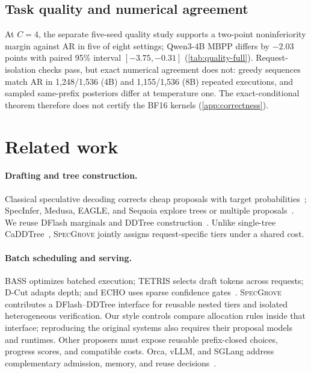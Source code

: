 \documentclass{article}
\newcommand{\method}{\textsc{SpecGrove}\xspace}
\begin{document}
\subsection{Task quality and numerical agreement}
\label{sec:quality}
At $C=4$, the separate five-seed quality study supports a two-point noninferiority margin against AR in five of eight settings; Qwen3-4B MBPP differs by $-2.03$ points with paired 95\% interval $[-3.75,-0.31]$ (\cref{tab:quality-full}). Request-isolation checks pass, but exact numerical agreement does not: greedy sequences match AR in 1,248/1,536 (4B) and 1,155/1,536 (8B) repeated executions, and sampled same-prefix posteriors differ at temperature one. The exact-conditional theorem therefore does not certify the BF16 kernels (\cref{app:correctness}).

\section{Related work}
\label{sec:related}
\paragraph{Drafting and tree construction.}
Classical speculative decoding corrects cheap proposals with target probabilities~\citep{leviathan2023fast,chen2023accelerating}; SpecInfer, Medusa, EAGLE, and Sequoia explore trees or multiple proposals~\citep{miao2024specinfer,cai2024medusa,li2024eagle,chen2024sequoia}. We reuse DFlash marginals and DDTree construction~\citep{chen2026dflash,ringel2026ddtree}. Unlike single-tree CaDDTree~\citep{zhang2026caddtree}, \method jointly assigns request-specific tiers under a shared cost.

\paragraph{Batch scheduling and serving.}
BASS optimizes batched execution; TETRIS selects draft tokens across requests; D-Cut adapts depth; and ECHO uses sparse confidence gates~\citep{qian2024bass,wu2025tetris,liu2026dcut,hu2026echo}. \method contributes a DFlash--DDTree interface for reusable nested tiers and isolated heterogeneous verification. Our style controls compare allocation rules inside that interface; reproducing the original systems also requires their proposal models and runtimes. Other proposers must expose reusable prefix-closed choices, progress scores, and compatible costs. Orca, vLLM, and SGLang address complementary admission, memory, and reuse decisions~\citep{yu2022orca,kwon2023vllm,zheng2023sglang}.
\end{document}
